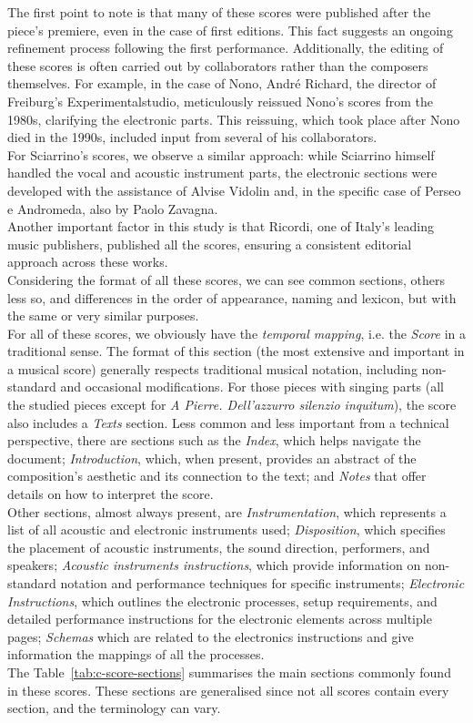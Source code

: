The first point to note is that many of these scores were published after the piece's premiere, even in the case of first editions. This fact suggests an ongoing refinement process following the first performance. Additionally, the editing of these scores is often carried out by collaborators rather than the composers themselves. For example, in the case of Nono, André Richard, the director of Freiburg’s Experimentalstudio, meticulously reissued Nono’s scores from the 1980s, clarifying the electronic parts. This reissuing, which took place after Nono died in the 1990s, included input from several of his collaborators.\\
For Sciarrino’s scores, we observe a similar approach: while Sciarrino himself handled the vocal and acoustic instrument parts, the electronic sections were developed with the assistance of Alvise Vidolin and, in the specific case of Perseo e Andromeda, also by Paolo Zavagna.\\
Another important factor in this study is that Ricordi, one of Italy’s leading music publishers, published all the scores, ensuring a consistent editorial approach across these works.\\
Considering the format of all these scores, we can see common sections, others less so, and differences in the order of appearance, naming and lexicon, but with the same or very similar purposes.\\
For all of these scores, we obviously have the \textit{temporal mapping}, i.e. the \textit{Score} in a traditional sense. The format of this section (the most extensive and important in a musical score) generally respects traditional musical notation, including non-standard and occasional modifications. For those pieces with singing parts (all the studied pieces except for \textit{A Pierre. Dell’azzurro silenzio inquitum}), the score also includes a \textit{Texts} section. Less common and less important from a technical perspective, there are sections such as the \textit{Index}, which helps navigate the document; \textit{Introduction}, which, when present, provides an abstract of the composition’s aesthetic and its connection to the text; and \textit{Notes} that offer details on how to interpret the score.\\
Other sections, almost always present, are \textit{Instrumentation}, which represents a list of all acoustic and electronic instruments used; \textit{Disposition}, which specifies the placement of acoustic instruments, the sound direction, performers, and speakers; \textit{Acoustic instruments instructions}, which provide information on non-standard notation and performance techniques for specific instruments; \textit{Electronic Instructions}, which outlines the electronic processes, setup requirements, and detailed performance instructions for the electronic elements across multiple pages; \textit{Schemas} which are related to the electronics instructions and give information the mappings of all the processes.\\
The Table~\ref{tab:c-score-sections} summarises the main sections commonly found in these scores. These sections are generalised since not all scores contain every section, and the terminology can vary.


